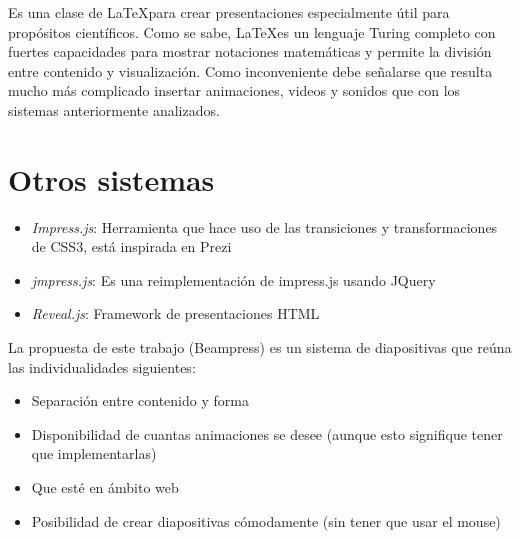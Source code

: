 		Es una clase de \LaTeX para crear presentaciones especialmente útil para propósitos científicos. Como se sabe, \LaTeX es un lenguaje Turing completo con fuertes capacidades para mostrar notaciones matemáticas y permite la división entre contenido y visualización. Como inconveniente debe señalarse que resulta mucho más complicado insertar animaciones, videos y sonidos que con los sistemas anteriormente analizados.	


	\section{Otros sistemas} %
	\label{sec:otros_sistemas}
		\begin{itemize}
			\item \textit{Impress.js}: Herramienta que hace uso de las transiciones y transformaciones de CSS3, está inspirada en Prezi
			\item \textit{jmpress.js}: Es una reimplementación de impress.js usando JQuery
			\item \textit{Reveal.js}: Framework de presentaciones HTML
		\end{itemize}

	La propuesta de este trabajo (Beampress) es un sistema de diapositivas que reúna las individualidades siguientes:

	\begin{itemize}
			\item Separación entre contenido y forma
			\item Disponibilidad de cuantas animaciones se desee (aunque esto signifique tener que implementarlas)
			\item Que esté en ámbito web
			\item Posibilidad de crear diapositivas cómodamente (sin tener que usar el mouse)
	\end{itemize}	

